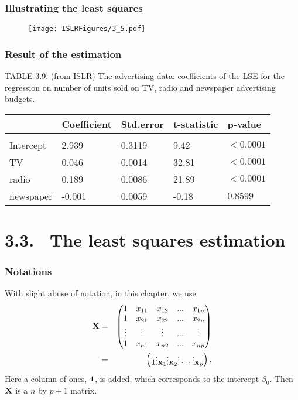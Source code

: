 \documentclass{beamer}
\begin{document}
        
        \begin{frame}
        	\frametitle{Illustrating the least squares}
        	
        	\begin{figure}[h]
        		\centering
        		\texttt{[image: ISLRFigures/3\_5.pdf]}	 
        	\end{figure}	
        \end{frame}
        
         
         \begin{frame} \frametitle{Result of the estimation}
         	TABLE 3.9. (from ISLR) The advertising data: coefficients of the LSE for the regression on 
         	number of units sold on TV, radio and newspaper advertising budgets.  
         	\begin{center}
         		\begin{adjustbox}{width=1\textwidth}
         			\small
         			\begin{tabular}{lllll} 
         				& Coefficient & Std.error & t-statistic &p-value  \\
         				\hline \\	
         				Intercept & 2.939 &0.3119& 9.42& $<0.0001$  \\
         				TV        & 0.046 &0.0014 & 32.81& $<0.0001$\\	
         				radio      & 0.189 &0.0086& 21.89& $<0.0001$\\	
         			newspaper      & -0.001  &0.0059& -0.18& $0.8599$\\		
         			\end{tabular}
         		\end{adjustbox} 
         	\end{center}
         \end{frame}	
      
    \section{3.3.  \  The least squares estimation}
      
      \begin{frame}
      	\frametitle{Notations}
      	With slight abuse of notation, in this chapter, we use
      	\begin{eqnarray*}
      		{\bf X} &=&   \begin{pmatrix}
      			1      &x_{11} & x_{12} &   ... &x_{1p} \cr
      			1      &x_{21} & x_{22} &   ... &x_{2p}\cr
      			\vdots &\vdots &  \vdots& ...    & \vdots   \cr
      			1      &x_{n1} & x_{n2} &     ...&x_{np}
      		\end{pmatrix} 
      		\\
      		&=&
      		\begin{pmatrix}  {\bf 1} \vdots {\bf x}_1 \vdots {\bf x}_2 \vdots \cdots \vdots {\bf x}_p
      		\end{pmatrix}.
      	\end{eqnarray*}
      	Here a column of ones, ${\bf 1}$,  is added, which corresponds to the intercept $\beta_0$.
      	Then ${\bf X}$ is a $n$ by $p+1$ matrix.
      \end{frame}
      
\end{document}
